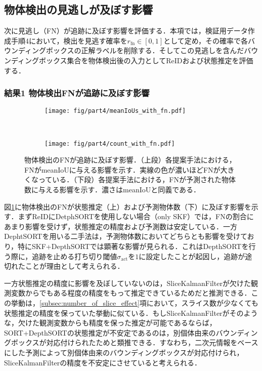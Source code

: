     \subsection{物体検出の見逃しが及ぼす影響}
    \label{subsec:FNeffect}

    次に見逃し（FN）が追跡に及ぼす影響を評価する．本項では，検証用データ作成手順4において，検出を見逃す確率を$r_{\text{fn}} \in [0, 1]$として定め，その確率で各バウンディングボックスの正解ラベルを削除する．そしてこの見逃しを含んだバウンディングボックス集合を物体検出後の入力としてReIDおよび状態推定を評価する．

        \subsubsection{結果1 物体検出FNが追跡に及ぼす影響}

        \begin{figure}[t]
            \begin{subfigure}[t]{\linewidth}
                \centering
                \texttt{[image: fig/part4/meanIoUs\_with\_fn.pdf]}
            \end{subfigure}
            \\
            \begin{subfigure}[t]{\linewidth}
                \centering
                \texttt{[image: fig/part4/count\_with\_fn.pdf]}
            \end{subfigure}
            \caption[物体検出のFNが追跡に及ぼす影響]{物体検出のFNが追跡に及ぼす影響．（上段）各提案手法における，FNがmeanIoUに与える影響を示す．実線の色が濃いほどFNが大きくなっている．（下段）各提案手法における，FNが予測された物体数に与える影響を示す．濃さはmeanIoUと同義である．}
            \label{fig:FN_effect}
        \end{figure}

        図\ref{fig:FN_effect}に物体検出のFNが状態推定（上）および予測物体数（下）に及ぼす影響を示す．まずReIDにDetphSORTを使用しない場合（only SKF）では，FNの割合にあまり影響を受けず，状態推定の精度および予測数は安定している．一方DephtSORTを用いる二手法は，予測物体数においてどちらとも影響を受けており，特にSKF+DepthSORTでは顕著な影響が見られる．これはDepthSORTを行う際に，追跡を止める打ち切り閾値$\sigma_{\text{act}}$を$1$に設定したことが起因し，追跡が途切れたことが理由として考えられる．

        一方状態推定の精度に影響を及ぼしていないのは，SliceKalmanFilterが欠けた観測変数からでもある程度の精度をもって推定できているためだと推測できる．この挙動は，\ref{subsec:number_of_slice_effect}項において，スライス数が少なくても状態推定の精度を保っていた挙動に似ている．もしSliceKalmanFilterがそのような，欠けた観測変数からも精度を保った推定が可能であるならば，SORT+DepthSORTの状態推定が不安定であるのは，別個体由来のバウンディングボックスが対応付けられたためと類推できる．すなわち，二次元情報をベースにした予測によって別個体由来のバウンディングボックスが対応付けられ，SliceKalmanFilterの精度を不安定にさせていると考えられる．

